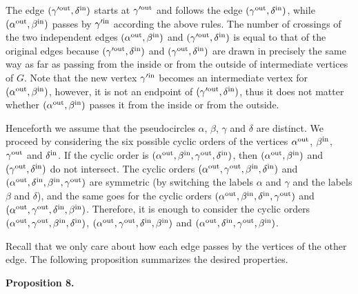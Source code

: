 \documentclass[10pt,a4paper]{amsart}
\begin{document}
The edge $(\gamma^{\prime\rm out},\delta^{\rm in})$ starts at $\gamma^{\prime\rm out}$ and follows the edge $(\gamma^{\rm out},\delta^{\rm in})$, while $(\alpha^{\rm out},\beta^{\rm in})$ passes by $\gamma^{\prime\rm in}$ according the above rules. The number of crossings of the two independent edges $(\alpha^{\rm out},\beta^{\rm in})$ and $(\gamma^{\prime\rm out},\delta^{\rm in})$ is equal to that of the original edges because $(\gamma^{\prime\rm out},\delta^{\rm in})$ and $(\gamma^{\rm out},\delta^{\rm in})$ are drawn in precisely the same way as far as passing from the inside or from the outside of intermediate vertices of $G$. Note that the new vertex $\gamma^{\prime\rm in}$ becomes an intermediate vertex for $(\alpha^{\rm out},\beta^{\rm in})$, however, it is not an endpoint of $(\gamma^{\prime\rm out},\delta^{\rm in})$, thus it does not matter whether $(\alpha^{\rm out},\beta^{\rm in})$ passes it from the inside or from the outside.
\par
\par
Henceforth we assume that the pseudocircles $\alpha$, $\beta$, $\gamma$ and $\delta$ are distinct. We proceed by considering the six possible cyclic orders of the vertices $\alpha^{\rm out}$, $\beta^{\rm in}$, $\gamma^{\rm out}$ and $\delta^{\rm in}$. If the cyclic order is $(\alpha^{\rm out},\beta^{\rm in},\gamma^{\rm out},\delta^{\rm in})$, then $(\alpha^{\rm out},\beta^{\rm in})$ and $(\gamma^{\rm out},\delta^{\rm in})$ do not intersect. The cyclic orders $(\alpha^{\rm out},\gamma^{\rm out},\beta^{\rm in},\delta^{\rm in})$ and $(\alpha^{\rm out},\delta^{\rm in},\beta^{\rm in},\gamma^{\rm out})$ are symmetric (by switching the labels $\alpha$ and $\gamma$ and the labels $\beta$ and $\delta$), and the same goes for the cyclic orders $(\alpha^{\rm out},\beta^{\rm in},\delta^{\rm in},\gamma^{\rm out})$ and $(\alpha^{\rm out},\gamma^{\rm out},\delta^{\rm in},\beta^{\rm in})$. Therefore, it is enough to consider the cyclic orders $(\alpha^{\rm out},\gamma^{\rm out},\beta^{\rm in},\delta^{\rm in})$, $(\alpha^{\rm out},\gamma^{\rm out},\delta^{\rm in},\beta^{\rm in})$ and $(\alpha^{\rm out},\delta^{\rm in},\gamma^{\rm out},\beta^{\rm in})$.
\par
\par
Recall that we only care about how each edge passes by the vertices of the other edge. The following proposition summarizes the desired properties.
\par
\par
\par\medskip\noindent\textbf{Proposition 8.}\par
\end{document}
